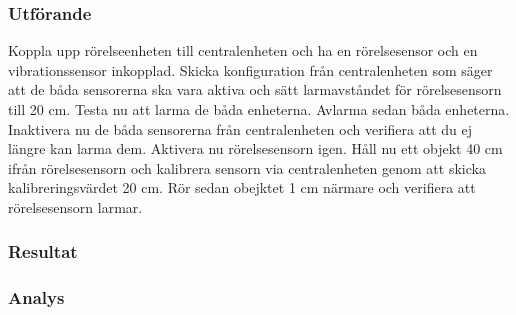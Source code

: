 \subsubsection*{Utförande}
Koppla upp rörelseenheten till centralenheten och ha en rörelsesensor och en vibrationssensor inkopplad. Skicka konfiguration från centralenheten som säger att de båda sensorerna ska vara aktiva och sätt larmavståndet för rörelsesensorn till 20 cm. Testa nu att larma de båda enheterna. Avlarma sedan båda enheterna. Inaktivera nu de båda sensorerna från centralenheten och verifiera att du ej längre kan larma dem. Aktivera nu rörelsesensorn igen. 
Håll nu ett objekt 40 cm ifrån rörelsesensorn och kalibrera sensorn via centralenheten genom att skicka kalibreringsvärdet 20 cm. Rör sedan obejktet 1 cm närmare och verifiera att rörelsesensorn larmar.


\subsubsection*{Resultat}



\subsubsection*{Analys}



